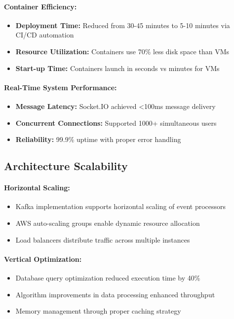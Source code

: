 \paragraph{Container Efficiency:}
\begin{itemize}
    \item \textbf{Deployment Time:} Reduced from 30-45 minutes to 5-10 minutes via CI/CD automation
    \item \textbf{Resource Utilization:} Containers use 70\% less disk space than VMs
    \item \textbf{Start-up Time:} Containers launch in seconds vs minutes for VMs
\end{itemize}

\paragraph{Real-Time System Performance:}
\begin{itemize}
    \item \textbf{Message Latency:} Socket.IO achieved <100ms message delivery

    \item \textbf{Concurrent Connections:} Supported 1000+ simultaneous users
    \item \textbf{Reliability:} 99.9\% uptime with proper error handling
\end{itemize}

\subsection{Architecture Scalability}

\paragraph{Horizontal Scaling:}
\begin{itemize}
    \item Kafka implementation supports horizontal scaling of event processors
    \item AWS auto-scaling groups enable dynamic resource allocation
    \item Load balancers distribute traffic across multiple instances
\end{itemize}

\paragraph{Vertical Optimization:}
\begin{itemize}
    \item Database query optimization reduced execution time by 40\%
    \item Algorithm improvements in data processing enhanced throughput
    \item Memory management through proper caching strategy
\end{itemize}

